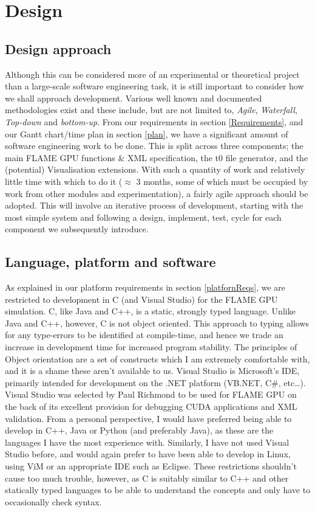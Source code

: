 \documentclass[11pt,a4paper]{article}
\begin{document}
\newpage
\section{Design}

\subsection{Design approach}
Although this can be considered more of an experimental or theoretical project than a large-scale software engineering task, it is still important to consider how we shall approach development. Various well known and documented methodologies exist and these include, but are not limited to, \emph{Agile}, \emph{Waterfall}, \emph{Top-down} and \emph{bottom-up}. From our requirements in section \ref{Requirements}, and our Gantt chart/time plan in section \ref{plan}, we have a significant amount of software engineering work to be done. This is split across three components; the main FLAME GPU functions \& XML specification, the t0 file generator, and the (potential) Visualisation extensions. With such a quantity of work and relatively little time with which to do it ($\approx$ 3 months, some of which must be occupied by work from other modules and experimentation), a fairly agile approach should be adopted. This will involve an iterative process of development, starting with the most simple system and following a design, implement, test, cycle for each component we subsequently introduce.

\subsection{Language, platform and software}
As explained in our platform requirements in section \ref{platfornReqs}, we are restricted to development in C (and Visual Studio) for the FLAME GPU simulation. C, like Java and C++, is a static, strongly typed language. Unlike Java and C++, however, C is not object oriented. This approach to typing allows for any type-errors to be identified at compile-time, and hence we trade an increase in development time for increased program stability. The principles of Object orientation are a set of constructs which I am extremely comfortable with, and it is a shame these aren't available to us. Visual Studio is Microsoft's IDE, primarily intended for development on the .NET platform (VB.NET, C\#, etc\ldots). Visual Studio was selected by Paul Richmond to be used for FLAME GPU on the back of its excellent provision for debugging CUDA applications and XML validation\cite{fgpuTechnical}. From a personal perspective, I would have preferred being able to develop in C++, Java or Python (and preferably Java), as these are the languages I have the most experience with. Similarly, I have not used Visual Studio before, and would again prefer to have been able to develop in Linux, using ViM or an appropriate IDE such as Eclipse. These restrictions shouldn't cause too much trouble, however, as C is suitably similar to C++ and other statically typed languages to be able to understand the concepts and only have to occasionally check syntax.
\end{document}
